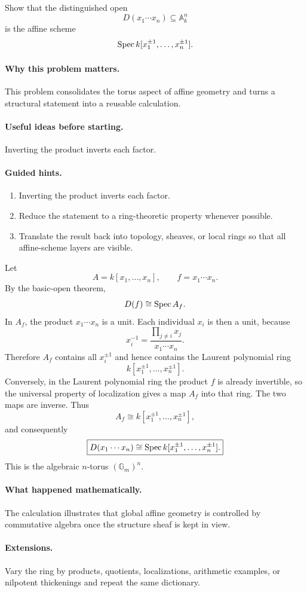 \begin{problem}\label{prob:vi18-p14}
Show that the distinguished open
\[
D(x_1\cdots x_n)\subseteq\mathbb A^n_k
\]
is the affine scheme
\[
\operatorname{Spec} k[x_1^{\pm1},\dots,x_n^{\pm1}].
\]
\end{problem}

\ifdefined\FullProblemDossiers
\paragraph{Why this problem matters.}
This problem consolidates the torus aspect of affine geometry and turns a structural statement into a reusable calculation.

\paragraph{Useful ideas before starting.}
Inverting the product inverts each factor.

\paragraph{Guided hints.}
\begin{enumerate}
\item Inverting the product inverts each factor.
\item Reduce the statement to a ring-theoretic property whenever possible.
\item Translate the result back into topology, sheaves, or local rings so that all affine-scheme layers are visible.
\end{enumerate}

\begin{solution}
Let
\[
A=k[x_1,\dots,x_n],\qquad f=x_1\cdots x_n.
\]
By the basic-open theorem,
\[
D(f)\cong\operatorname{Spec} A_f.
\]
In $A_f$, the product $x_1\cdots x_n$ is a unit. Each individual $x_i$ is then a unit, because
\[
x_i^{-1}=\frac{\prod_{j\ne i}x_j}{x_1\cdots x_n}.
\]
Therefore $A_f$ contains all $x_i^{\pm1}$ and hence contains the Laurent polynomial ring
\[
k[x_1^{\pm1},\dots,x_n^{\pm1}].
\]
Conversely, in the Laurent polynomial ring the product $f$ is already invertible, so the universal property of localization gives a map $A_f$ into that ring. The two maps are inverse. Thus
\[
A_f\cong k[x_1^{\pm1},\dots,x_n^{\pm1}],
\]
and consequently
\[
\boxed{D(x_1\cdots x_n)\cong\operatorname{Spec} k[x_1^{\pm1},\dots,x_n^{\pm1}].}
\]
This is the algebraic $n$-torus $(\mathbb G_m)^n$.
\end{solution}


\paragraph{What happened mathematically.}
The calculation illustrates that global affine geometry is controlled by commutative algebra once the structure sheaf is kept in view.

\paragraph{Extensions.}
Vary the ring by products, quotients, localizations, arithmetic examples, or nilpotent thickenings and repeat the same dictionary.
\fi
